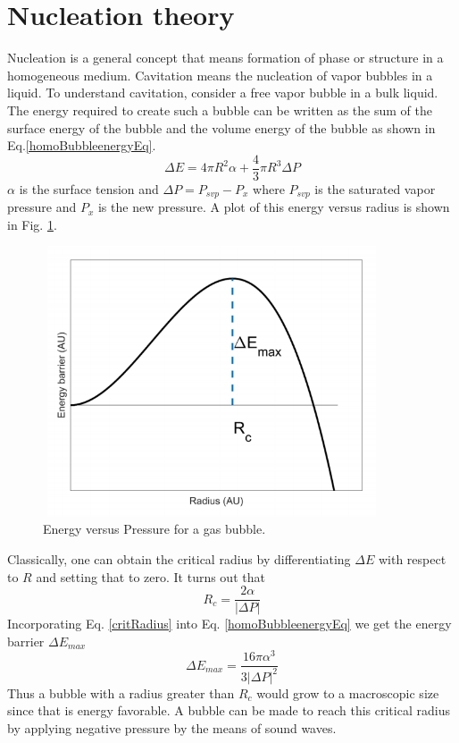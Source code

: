 \section{Nucleation theory}
Nucleation is a general concept that means formation of phase or structure in a homogeneous medium. Cavitation means the nucleation of vapor bubbles in a liquid. To understand cavitation, consider a free vapor bubble in a bulk liquid. The energy required to create such a bubble can be written as the sum of the surface energy of the bubble and the volume energy of the bubble as shown in Eq.\ref{homoBubbleenergyEq}.
\begin{equation}\label{homoBubbleenergyEq}
\Delta E = 4\pi R^2\alpha + \frac{4}{3}\pi R^3\Delta P
\end{equation}
$\alpha$ is the surface tension and $\Delta P = P_{svp} - P_x$ where $P_{svp}$ is the saturated vapor pressure and $P_x$ is the new pressure. A plot of this energy versus radius is shown in Fig. \ref{energyBarrier}.
\begin{figure}[H]
\centering 
\includegraphics[width=100mm, height=80mm]{Nucleation_Experiment/energyBarrier.png}
\caption{Energy versus Pressure for a gas bubble. \cite{Yang2018thesis}}
\label{energyBarrier}
\end{figure}

Classically, one can obtain the critical radius by differentiating $\Delta E$ with respect to $R$ and setting that to zero. It turns out that
\begin{equation}\label{critRadius}
R_c = \frac{2\alpha}{|\Delta P|}
\end{equation}
Incorporating Eq. \ref{critRadius} into Eq. \ref{homoBubbleenergyEq} we get the energy barrier $\Delta E_{max}$
\begin{equation}\label{energyBarriereq}
\Delta E_{max} = \frac{16\pi \alpha^3}{3|\Delta P|^2}
\end{equation}
Thus a bubble with a radius greater than $R_c$ would grow to a macroscopic size since that is energy favorable. A bubble can be made to reach this critical radius by applying negative pressure by the means of sound waves.

